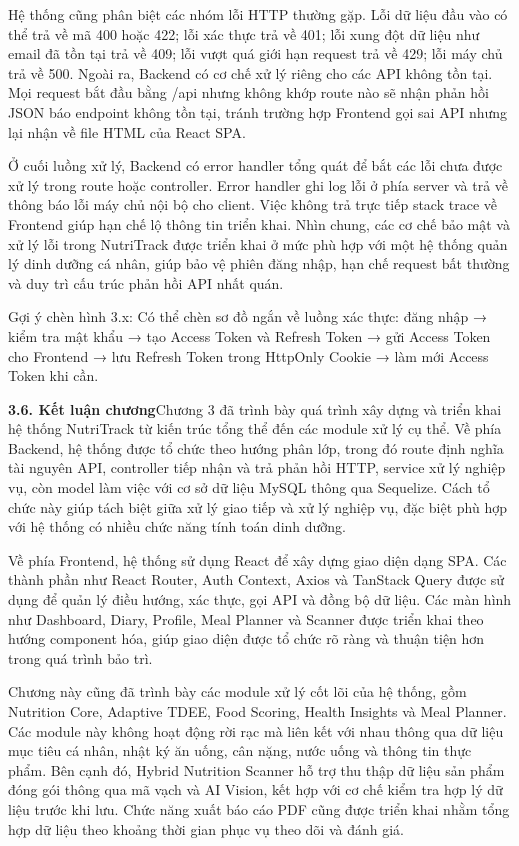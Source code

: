 Hệ thống cũng phân biệt các nhóm lỗi HTTP thường gặp. Lỗi dữ liệu đầu vào có thể trả về mã 400 hoặc 422; lỗi xác thực trả về 401; lỗi xung đột dữ liệu như email đã tồn tại trả về 409; lỗi vượt quá giới hạn request trả về 429; lỗi máy chủ trả về 500. Ngoài ra, Backend có cơ chế xử lý riêng cho các API không tồn tại. Mọi request bắt đầu bằng /api nhưng không khớp route nào sẽ nhận phản hồi JSON báo endpoint không tồn tại, tránh trường hợp Frontend gọi sai API nhưng lại nhận về file HTML của React SPA.

Ở cuối luồng xử lý, Backend có error handler tổng quát để bắt các lỗi chưa được xử lý trong route hoặc controller. Error handler ghi log lỗi ở phía server và trả về thông báo lỗi máy chủ nội bộ cho client. Việc không trả trực tiếp stack trace về Frontend giúp hạn chế lộ thông tin triển khai. Nhìn chung, các cơ chế bảo mật và xử lý lỗi trong NutriTrack được triển khai ở mức phù hợp với một hệ thống quản lý dinh dưỡng cá nhân, giúp bảo vệ phiên đăng nhập, hạn chế request bất thường và duy trì cấu trúc phản hồi API nhất quán.

Gợi ý chèn hình 3.x: Có thể chèn sơ đồ ngắn về luồng xác thực: đăng nhập → kiểm tra mật khẩu → tạo Access Token và Refresh Token → gửi Access Token cho Frontend → lưu Refresh Token trong HttpOnly Cookie → làm mới Access Token khi cần.

\textbf{3.6. Kết luận chương}Chương 3 đã trình bày quá trình xây dựng và triển khai hệ thống NutriTrack từ kiến trúc tổng thể đến các module xử lý cụ thể. Về phía Backend, hệ thống được tổ chức theo hướng phân lớp, trong đó route định nghĩa tài nguyên API, controller tiếp nhận và trả phản hồi HTTP, service xử lý nghiệp vụ, còn model làm việc với cơ sở dữ liệu MySQL thông qua Sequelize. Cách tổ chức này giúp tách biệt giữa xử lý giao tiếp và xử lý nghiệp vụ, đặc biệt phù hợp với hệ thống có nhiều chức năng tính toán dinh dưỡng.

Về phía Frontend, hệ thống sử dụng React để xây dựng giao diện dạng SPA. Các thành phần như React Router, Auth Context, Axios và TanStack Query được sử dụng để quản lý điều hướng, xác thực, gọi API và đồng bộ dữ liệu. Các màn hình như Dashboard, Diary, Profile, Meal Planner và Scanner được triển khai theo hướng component hóa, giúp giao diện được tổ chức rõ ràng và thuận tiện hơn trong quá trình bảo trì.

Chương này cũng đã trình bày các module xử lý cốt lõi của hệ thống, gồm Nutrition Core, Adaptive TDEE, Food Scoring, Health Insights và Meal Planner. Các module này không hoạt động rời rạc mà liên kết với nhau thông qua dữ liệu mục tiêu cá nhân, nhật ký ăn uống, cân nặng, nước uống và thông tin thực phẩm. Bên cạnh đó, Hybrid Nutrition Scanner hỗ trợ thu thập dữ liệu sản phẩm đóng gói thông qua mã vạch và AI Vision, kết hợp với cơ chế kiểm tra hợp lý dữ liệu trước khi lưu. Chức năng xuất báo cáo PDF cũng được triển khai nhằm tổng hợp dữ liệu theo khoảng thời gian phục vụ theo dõi và đánh giá.

